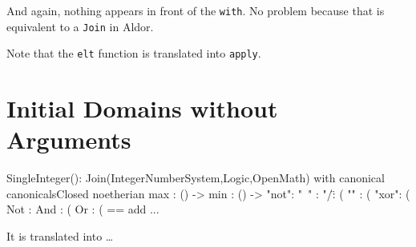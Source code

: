 \documentclass{article}
\begin{document}
And again, nothing appears in front of the \verb'with'. No problem
because that is equivalent to a \verb'Join' in Aldor.

Note that the \verb'elt' function is translated into \verb'apply'.



















\section{Initial Domains without Arguments}
\label{sec:InitDomain}
\begin{code}
SingleInteger(): Join(IntegerNumberSystem,Logic,OpenMath) with
   canonical
   canonicalsClosed
   noetherian
   max      : () -> %
   min      : () -> %
   "not":   %
   "~"  :   %
   "/\": (%
   "\/" : (%
   "xor": (%
   Not  : %
   And  : (%
   Or   : (%
 == add
   ...
\end{code}
It is translated into \ldots
\end{document}
